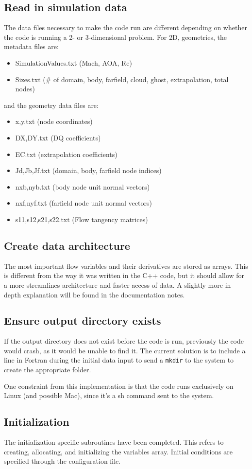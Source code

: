 \documentclass[12pt]{article}
\begin{document}
    \subsection{Read in simulation data}
    The data files necessary to make the code run are different depending on whether the code is running a 2- or 3-dimensional problem. For 2D, geometries, the metadata files are:
    \begin{itemize}
        \item SimulationValues.txt (Mach, AOA, Re)
        \item Sizes.txt (\# of domain, body, farfield, cloud, ghost, extrapolation, total nodes)
    \end{itemize}
    and the geometry data files are:
    \begin{itemize}
        \item x,y.txt (node coordinates)
        \item DX,DY.txt (DQ coefficients)
        \item EC.txt (extrapolation coefficients)
        \item Jd,Jb,Jf.txt (domain, body, farfield node indices)
        \item nxb,nyb.txt (body node unit normal vectors)
        \item nxf,nyf.txt (farfield node unit normal vectors)
        \item s11,s12,s21,s22.txt (Flow tangency matrices)
    \end{itemize}

    \subsection{Create data architecture}
    The most important flow variables and their derivatives are stored as arrays. This is different from the way it was written in the C++ code, but it should allow for a more streamlines architecture and faster access of data. A slightly more in-depth explanation will be found in the documentation notes.

    \subsection{Ensure output directory exists}
    If the output directory does not exist before the code is run, previously the code would crash, as it would be unable to find it. The current solution is to include a line in Fortran during the initial data input to send a \texttt{mkdir} to the system to create the appropriate folder.

    One constraint from this implementation is that the code runs exclusively on Linux (and possible Mac), since it's a sh command sent to the system.

    \subsection{Initialization}
    The initialization specific subroutines have been completed. This refers to creating, allocating, and initializing the variables array. Initial conditions are specified through the configuration file.
\end{document}
